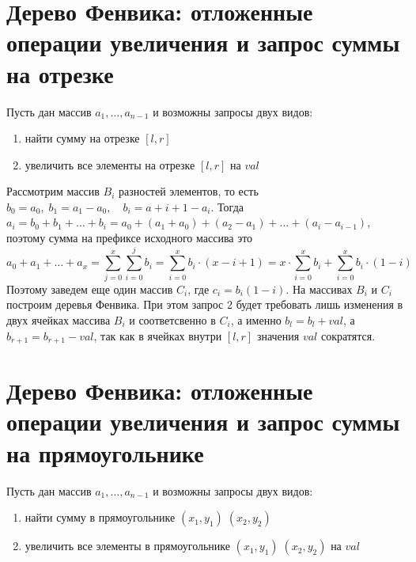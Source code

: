 \setcounter{section}{72}
\section{Дерево Фенвика: отложенные операции увеличения и запрос суммы на отрезке}

\par \noindent Пусть дан массив $a_1, \ldots, a_{n-1}$ и возможны запросы двух видов:
\begin{enumerate}
    \item найти сумму на отрезке $[l,r]$
    \item увеличить все элементы на отрезке $[l,r]$ на $val$
\end{enumerate}
Рассмотрим массив $B_i$ разностей элементов, то есть $b_0=a_0, \; b_1=a_1-a_0, \quad b_i=a+{i+1}-a_i$. Тогда $a_i = b_0 + b_1 + \ldots +b_i = a_0 +(a_1+a_0) + (a_2-a_1) + \ldots +(a_i-a_{i-1})$, поэтому сумма на префиксе исходного массива это $$a_0 + a_1 + \ldots +a_x = \sum_{j=0}^{x}\sum_{i=0}^{j}b_i = \sum_{i=0}^{x}b_i\cdot(x-i+1)=x\cdot\sum_{i=0}^{x}b_i+ \sum_{i=0}^{x}b_i\cdot(1-i)$$
Поэтому заведем еще один массив $C_i$, где $c_i=b_i(1-i)$. На массивах $B_i$ и $C_i$ построим деревья Фенвика. 
\newline При этом запрос 2 будет требовать лишь изменения в двух ячейках массива $B_i$ и соответсвенно в $C_i$, а именно $b_l = b_l + val$, а $b_{r+1} = b_{r+1} - val$, так как в ячейках внутри $[l,r]$ значения $val$ сократятся.

\section{Дерево Фенвика: отложенные операции увеличения и запрос суммы на прямоугольнике}

\par \noindent Пусть дан массив $a_1, \ldots, a_{n-1}$ и возможны запросы двух видов:
\begin{enumerate}
    \item найти сумму в прямоугольнике $(x_1,y_1) \; (x_2,y_2)$
    \item увеличить все элементы в прямоугольнике $(x_1,y_1) \; (x_2,y_2)$ на $val$
\end{enumerate}

